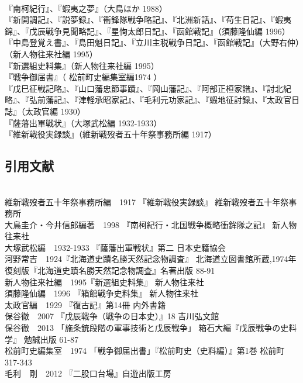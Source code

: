 \documentclass[11pt,report]{jsarticle}
\begin{document}
\mbox{}\\ 
『南柯紀行』、『蝦夷之夢』（大鳥ほか 1988）\\
『新開調記』、『説夢録』、『衝鋒隊戦争略記』、『北洲新話』、『苟生日記』、『蝦夷錦』、『戊辰戦争見聞略記』、『星恂太郎日記』、『函館戦記』（須藤隆仙編 1996）\\
『中島登覚え書』、『島田魁日記』、『立川主税戦争日記』、『函館戦記』（大野右仲）（新人物往来社編 1995）\\
『新選組史料集』（新人物往来社編 1995）\\
『戦争御届書』（ 松前町史編集室編1974 ）\\
『戊巳征戦記略』、『山口藩忠節事蹟』、『岡山藩記』、『阿部正桓家譜』、『討北紀略』、『弘前藩記』、『津軽承昭家記』、『毛利元功家記』、『蝦地征討録』、『太政官日誌』（太政官編 1930）\\
『薩藩出軍戦状』（大塚武松編 1932-1933）\\
『維新戦役実録談』（維新戦歿者五十年祭事務所編 1917）\\

\subsection*{引用文献}
\vspace{-1\baselineskip}
\mbox{}\\ 
維新戦歿者五十年祭事務所編　1917 『維新戦役実録談』 維新戦歿者五十年祭事務所\\
大鳥圭介・今井信郎編著　1998 『南柯紀行・北国戦争概略衝鉾隊之記』 新人物往来社\\
大塚武松編　1932-1933 『薩藩出軍戦状』第二 日本史籍協会\\
河野常吉　1924『北海道史蹟名勝天然記念物調査』 北海道立図書館所蔵,1974年復刻版『北海道史蹟名勝天然記念物調査』名著出版 88-91\\
新人物往来社編　1995『新選組史料集』 新人物往来社\\
須藤隆仙編　1996 『箱館戦争史料集』 新人物往来社\\
太政官編　1929 『復古記』第14冊 内外書籍\\
保谷徹　2007 『戊辰戦争（戦争の日本史）』18 吉川弘文館\\
保谷徹　2013 「施条銃段階の軍事技術と戊辰戦争」 箱石大編『戊辰戦争の史料学』 勉誠出版 61-87\\
松前町史編集室　1974 「戦争御届出書」『松前町史（史料編）』第1巻 松前町 317-343\\
毛利　剛　2012 『二股口台場』自遊出版工房\\
\end{document}

